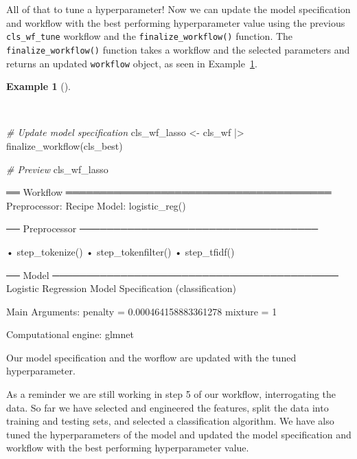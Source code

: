 \documentclass[
  letterpaper,
]{latex/krantz}
\newenvironment{Shaded}{\begin{snugshade}}{\end{snugshade}}
\newcommand{\CommentTok}[1]{\textcolor[rgb]{0.00,0.00,0.00}{\textit{#1}}}
\newcommand{\FunctionTok}[1]{\textcolor[rgb]{0.00,0.00,0.00}{#1}}
\newcommand{\NormalTok}[1]{\textcolor[rgb]{0.00,0.00,0.00}{#1}}
\newcommand{\OtherTok}[1]{\textcolor[rgb]{0.00,0.00,0.00}{#1}}
\newcommand{\SpecialCharTok}[1]{\textcolor[rgb]{0.00,0.00,0.00}{#1}}
\theoremstyle{definition}
\newtheorem{example}{Example}[chapter]
\theoremstyle{remark}
\begin{document}
All of that to tune a hyperparameter! Now we can update the model
specification and workflow with the best performing hyperparameter value
using the previous \texttt{cls\_wf\_tune} workflow and the
\texttt{finalize\_workflow()} function. The
\texttt{finalize\_workflow()} function takes a workflow and the selected
parameters and returns an updated \texttt{workflow} object, as seen in
Example~\ref{exm-pda-class-tune-hyperparameters-update-workflow}.

\begin{example}[]\protect\hypertarget{exm-pda-class-tune-hyperparameters-update-workflow}{}\label{exm-pda-class-tune-hyperparameters-update-workflow}

~

\begin{Shaded}
\begin{Highlighting}[]
\CommentTok{\# Update model specification}
\NormalTok{cls\_wf\_lasso }\OtherTok{\textless{}{-}}
\NormalTok{  cls\_wf }\SpecialCharTok{|\textgreater{}}
  \FunctionTok{finalize\_workflow}\NormalTok{(cls\_best)}

\CommentTok{\# Preview}
\NormalTok{cls\_wf\_lasso}
\end{Highlighting}
\end{Shaded}

\begin{Shaded}
\begin{Highlighting}[]
\NormalTok{══ Workflow ═══════════════════════════════════════}
\NormalTok{Preprocessor: Recipe}
\NormalTok{Model: logistic\_reg()}

\NormalTok{── Preprocessor ───────────────────────────────────}

\NormalTok{• step\_tokenize()}
\NormalTok{• step\_tokenfilter()}
\NormalTok{• step\_tfidf()}

\NormalTok{── Model ──────────────────────────────────────────}
\NormalTok{Logistic Regression Model Specification (classification)}

\NormalTok{Main Arguments:}
\NormalTok{  penalty = 0.000464158883361278}
\NormalTok{  mixture = 1}

\NormalTok{Computational engine: glmnet}
\end{Highlighting}
\end{Shaded}

\end{example}

Our model specification and the worflow are updated with the tuned
hyperparameter.

As a reminder we are still working in step 5 of our workflow,
interrogating the data. So far we have selected and engineered the
features, split the data into training and testing sets, and selected a
classification algorithm. We have also tuned the hyperparameters of the
model and updated the model specification and workflow with the best
performing hyperparameter value.
\end{document}
